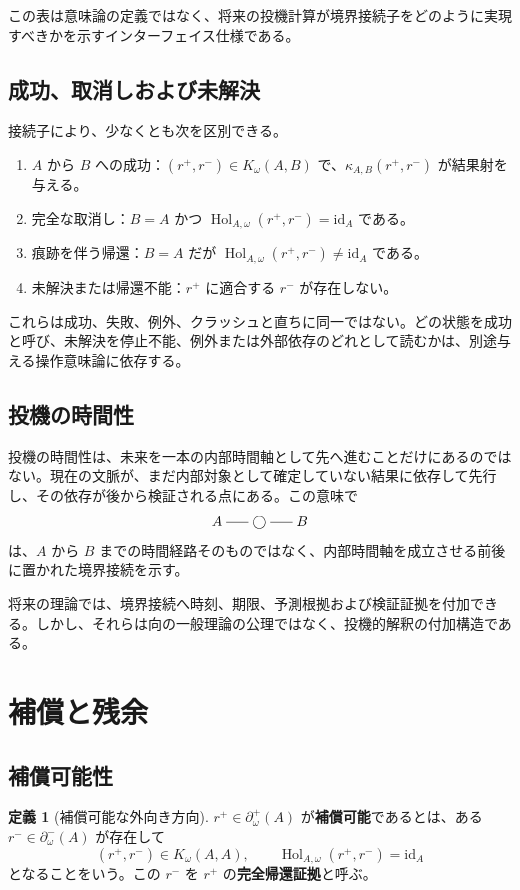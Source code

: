\documentclass[a4paper,11pt]{ltjsarticle}
\theoremstyle{definition}
\newtheorem{definition}{定義}[section]
\theoremstyle{plain}
\newcommand{\id}{\mathrm{id}}
\newcommand{\Hol}{\operatorname{Hol}}
\newcommand{\dfix}{\bigcirc}
\newcommand{\dline}{\mathrel{\rule[0.55ex]{1.6em}{0.4pt}}}
\begin{document}
この表は意味論の定義ではなく、将来の投機計算が境界接続子をどのように実現すべきかを示すインターフェイス仕様である。

\subsection{成功、取消しおよび未解決}

接続子により、少なくとも次を区別できる。
\begin{enumerate}
 \item $A$ から $B$ への成功：$(r^+,r^-)\in K_\omega(A,B)$ で、$\kappa_{A,B}(r^+,r^-)$ が結果射を与える。
 \item 完全な取消し：$B=A$ かつ $\Hol_{A,\omega}(r^+,r^-)=\id_A$ である。
 \item 痕跡を伴う帰還：$B=A$ だが $\Hol_{A,\omega}(r^+,r^-)\neq\id_A$ である。
 \item 未解決または帰還不能：$r^+$ に適合する $r^-$ が存在しない。
\end{enumerate}

これらは成功、失敗、例外、クラッシュと直ちに同一ではない。どの状態を成功と呼び、未解決を停止不能、例外または外部依存のどれとして読むかは、別途与える操作意味論に依存する。

\subsection{投機の時間性}

投機の時間性は、未来を一本の内部時間軸として先へ進むことだけにあるのではない。現在の文脈が、まだ内部対象として確定していない結果に依存して先行し、その依存が後から検証される点にある。この意味で
\[
 A\dline\dfix\dline B
\]
は、$A$ から $B$ までの時間経路そのものではなく、内部時間軸を成立させる前後に置かれた境界接続を示す。

将来の理論では、境界接続へ時刻、期限、予測根拠および検証証拠を付加できる。しかし、それらは向の一般理論の公理ではなく、投機的解釈の付加構造である。

\section{補償と残余}

\subsection{補償可能性}

\begin{definition}[補償可能な外向き方向]
$r^+\in\partial_\omega^+(A)$ が\textbf{補償可能}であるとは、ある $r^-\in\partial_\omega^-(A)$ が存在して
\[
 (r^+,r^-)\in K_\omega(A,A),
 \qquad
 \Hol_{A,\omega}(r^+,r^-)=\id_A
\]
となることをいう。この $r^-$ を $r^+$ の\textbf{完全帰還証拠}と呼ぶ。
\end{definition}
\end{document}
